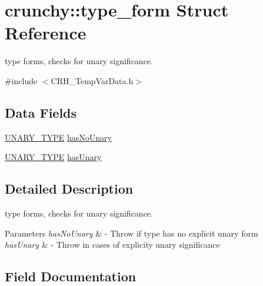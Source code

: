 \hypertarget{structcrunchy_1_1type__form}{}\section{crunchy\+:\+:type\+\_\+form Struct Reference}
\label{structcrunchy_1_1type__form}


type forms, checks for unary significance.  




{\ttfamily \#include $<$C\+R\+H\+\_\+\+Temp\+Var\+Data.\+h$>$}

\subsection*{Data Fields}
\begin{DoxyCompactItemize}
\item 
\hyperlink{_c_r_h___temp_var_data_8h_af66cdd64c4d0c558d4cb016c4e0d6694}{U\+N\+A\+R\+Y\+\_\+\+T\+Y\+P\+E} \hyperlink{structcrunchy_1_1type__form_a5941739fb7b37a91b52fe240614aa388}{has\+No\+Unary}
\item 
\hyperlink{_c_r_h___temp_var_data_8h_af66cdd64c4d0c558d4cb016c4e0d6694}{U\+N\+A\+R\+Y\+\_\+\+T\+Y\+P\+E} \hyperlink{structcrunchy_1_1type__form_a78a0fdae7e17412ea3a5374fa7d0925c}{has\+Unary}
\end{DoxyCompactItemize}


\subsection{Detailed Description}
type forms, checks for unary significance. 


\begin{DoxyParams}{Parameters}
{\em has\+No\+Unary} & -\/ Throw if type has no explicit unary form \\
\hline
{\em has\+Unary} & -\/ Throw in cases of explicity unary significance \\
\hline
\end{DoxyParams}


\subsection{Field Documentation}
\hypertarget{structcrunchy_1_1type__form_a5941739fb7b37a91b52fe240614aa388}{}
